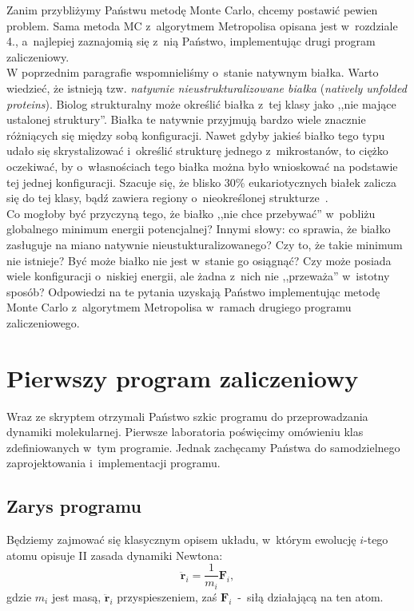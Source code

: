 \documentclass[a4paper,11pt,twoside]{book}
\begin{document}
Zanim przybliżymy Państwu metodę Monte Carlo, chcemy postawić pewien problem. Sama metoda MC z~algorytmem Metropolisa opisana jest w~rozdziale 4., a~najlepiej zaznajomią się z~nią Państwo, implementując drugi program zaliczeniowy.\\

W poprzednim paragrafie wspomnieliśmy o~stanie natywnym białka. Warto wiedzieć, że istnieją tzw. \emph{natywnie nieustrukturalizowane białka} (\emph{natively unfolded proteins}). Biolog strukturalny może określić białka z~tej klasy jako ,,nie mające ustalonej struktury''. Białka te natywnie przyjmują bardzo wiele znacznie różniących się między sobą konfiguracji. Nawet gdyby jakieś białko tego typu udało się skrystalizować i~określić strukturę jednego z~mikrostanów, to ciężko oczekiwać, by o~własnościach tego białka można było wnioskować na podstawie tej jednej konfiguracji. Szacuje się, że blisko 30\% eukariotycznych białek zalicza się do tej klasy, bądź zawiera regiony o~nieokreślonej strukturze~\cite{unfolded}.\\

Co mogłoby być przyczyną tego, że białko ,,nie chce przebywać'' w~pobliżu globalnego minimum energii potencjalnej? Innymi słowy: co sprawia, że białko zasługuje na miano natywnie nieustukturalizowanego? Czy to, że takie minimum nie istnieje? Być może białko nie jest w~stanie go osiągnąć? Czy może posiada wiele konfiguracji o~niskiej energii, ale żadna z~nich nie ,,przeważa'' w~istotny sposób? Odpowiedzi na te pytania uzyskają Państwo implementując metodę Monte Carlo z~algorytmem Metropolisa w~ramach drugiego programu zaliczeniowego.
\chapter{Pierwszy program zaliczeniowy}
Wraz ze skryptem otrzymali Państwo szkic programu do przeprowadzania dynamiki molekularnej. Pierwsze laboratoria poświęcimy omówieniu klas zdefiniowanych w~tym programie. Jednak zachęcamy Państwa do samodzielnego zaprojektowania i~implementacji programu.  
\section{Zarys programu}
Będziemy zajmować się klasycznym opisem układu, w~którym ewolucję $i$-tego atomu opisuje II zasada dynamiki Newtona:
\begin{equation}
\ddot{\mathbf{r}}_i = \frac{1}{m_i} \mathbf{F}_i,\label{IIzasada}
\end{equation}
gdzie $m_i$ jest masą, $\ddot{\mathbf{r}}_i$ przyspieszeniem, zaś $\mathbf{F}_i$~-~siłą działającą na ten atom.\\
\end{document}
